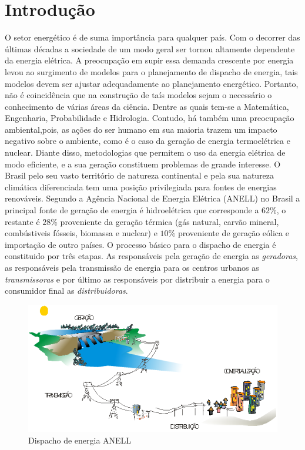 \chapter{Introdução}
O setor energ\'{e}tico \'{e} de suma import\^{a}ncia para qualquer pa\'{i}s. Com o decorrer das \'{u}ltimas d\'{e}cadas a sociedade de 
um modo geral ser tornou altamente  dependente da energia el\'{e}trica. A preocupa\c{c}\~{a}o em supir essa demanda crescente por energia levou
ao surgimento de modelos para o planejamento de dispacho de energia, tais modelos devem ser ajustar adequadamente ao planejamento energ\'{e}tico.
Portanto, n\~{a}o \'{e} coincid\^{e}ncia que na constru\c{c}\~{a}o de ta\'{i}s modelos sejam o necess\'{a}rio o conhecimento de v\'{a}rias
\'{a}reas da ci\^{e}ncia. Dentre as quais tem-se a Matem\'{a}tica, Engenharia, Probabilidade e Hidrologia. Contudo, h\'{a} tamb\'{e}m uma 
preocupa\c{c}\~{a}o ambiental,pois, as a\c{c}\~{o}es do ser humano em sua maioria trazem  um impacto negativo sobre o ambiente, como \'{e} o caso
da gera\c{c}\~{a}o de energia termoel\'{e}trica e nuclear. Diante disso, metodologias que permitem o uso da energia el\'{e}trica de modo
eficiente, e a sua gera\c{c}\~{a}o constituem problemas de grande interesse. O Brasil pelo seu vasto territ\'{o}rio de natureza
continental e pela sua natureza clim\'{a}tica diferenciada tem uma posi\c{c}\~{a}o privilegiada para fontes de energias renov\'{a}veis.
 Segundo a Ag\^{e}ncia Nacional de Energia El\'{e}trica (ANELL) no Brasil a principal
fonte de gera\c{c}\~{a}o de energia \'{e} hidroel\'{e}trica que corresponde a $62\%$, o restante \'{e} $28\%$ proveniente da gera\c{c}\~{a}o
t\'{e}rmica (g\'{a}s natural, carv\~{a}o mineral, comb\'{u}stiveis f\'{o}sseis, biomassa e nuclear) e  $10\%$ proveniente de gera\c{c}\~{a}o
e\'{o}lica e importa\c{c}\~{a}o de outro pa\'{i}ses. O processo b\'{a}sico para o dispacho de energia \'{e} constituido por tr\^{e}s etapas.
As respons\'{a}veis pela gera\c{c}\~{a}o de energia as \textit{geradoras}, as respons\'{a}veis pela transmiss\~{a}o de energia para os centros
urbanos as \textit{transmissoras} e por \'{u}ltimo as respons\'{a}veis por distribuir a energia para o consumidor final as \textit{distribuidoras}. 
\begin{figure}[!tb]
\centering
\includegraphics[scale=1.0]{./imagens/ANELL.png}
\caption{Dispacho de energia ANELL}
\label{energia}
\end{figure}
